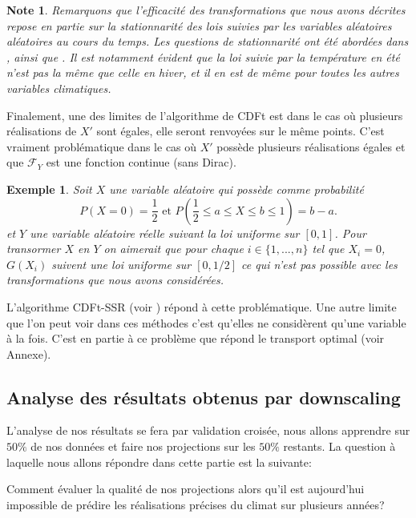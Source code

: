\documentclass[a4paper,11pt]{article}
\numberwithin{equation}{section}
\newtheorem{example}{Exemple}
\newtheorem{note}{Note}
\begin{document}
\begin{note}
	Remarquons que l'efficacité des transformations que nous avons décrites repose en partie sur la stationnarité des lois suivies par les variables aléatoires aléatoires au cours du temps. Les questions de stationnarité ont été abordées dans \cite{maraun2012nonstationarities}, \cite{christensen2008need} ainsi que \cite{nahar2017assessing}. Il est notamment évident que la loi suivie par la température en été n'est pas la même que celle en hiver, et il en est de même pour toutes les autres variables climatiques.
\end{note}

Finalement, une des limites de l'algorithme de CDFt est dans le cas où plusieurs réalisations de $X'$ sont égales, elle seront renvoyées sur le même points. C'est vraiment problématique dans le cas où $X'$ possède plusieurs réalisations égales et que $\mathcal{F}_Y$ est une fonction continue (sans Dirac).

\begin{example}
	Soit $X$ une variable aléatoire qui possède comme probabilité 
	\[P(X=0)=\frac{1}{2} \textrm{ et } P( \frac{1}{2}\leq a\leq X \leq b\leq 1 )=b-a.\]
	et $Y$ une variable aléatoire réelle suivant la loi uniforme sur $[0,1]$. Pour transormer $X$ en $Y$ on aimerait que pour chaque $i\in \{1,...,n\}$ tel que $X_i=0$, $G(X_i)$ suivent une loi uniforme sur $[0,1/2]$ ce qui n'est pas possible avec les transformations que nous avons considérées.
\end{example}  

L'algorithme CDFt-SSR (voir \cite{vrac2012dynamical}) répond à cette problématique. Une autre limite que l'on peut voir dans ces méthodes c'est qu'elles ne considèrent qu'une variable à la fois. C'est en partie à ce problème que répond le transport optimal (voir Annexe). 


\subsection{Analyse des résultats obtenus par downscaling}
\label{analyse-pred}

L'analyse de nos résultats se fera par validation croisée, nous allons apprendre sur $50\%$ de nos données et faire nos projections sur les $50\%$ restants. La question à laquelle nous allons répondre dans cette partie est la suivante:

Comment évaluer la qualité de nos projections alors qu'il est aujourd'hui impossible de prédire les réalisations précises du climat sur plusieurs années?
\end{document}
